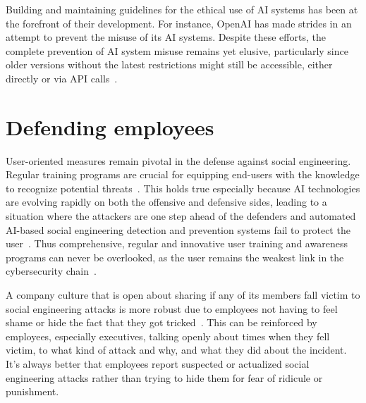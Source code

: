 
Building and maintaining guidelines for the ethical use of AI systems has been at the forefront of their development. For instance, OpenAI has made strides in an attempt to prevent the misuse of its AI systems. Despite these efforts, the complete prevention of AI system misuse remains yet elusive, particularly since older versions without the latest restrictions might still be accessible, either directly or via API calls~\citep{gupta_From_ChatGPT_to_ThreatGPT_2023}.

\section{Defending employees}
\begin{comment}
\end{comment}

User-oriented measures remain pivotal in the defense against social engineering. Regular training programs are crucial for equipping end-users with the knowledge to recognize potential threats~\citep{hadnagy_Social_Engineering_The_Science_2018}. This holds true especially because AI technologies are evolving rapidly on both the offensive and defensive sides, leading to a situation where the attackers are one step ahead of the defenders and automated AI-based social engineering detection and prevention systems fail to protect the user~\citep{fakhouri_AI_Driven_Solutions_SE_Attacks_2024}. Thus comprehensive, regular and innovative user training and awareness programs can never be overlooked, as the user remains the weakest link in the cybersecurity chain~\citep{mitnick_The_Art_of_Deception_2003}.

A company culture that is open about sharing if any of its members fall victim to social engineering attacks is more robust due to employees not having to feel shame or hide the fact that they got tricked~\citep{hadnagy_Social_Engineering_The_Science_2018}. This can be reinforced by employees, especially executives, talking openly about times when they fell victim, to what kind of attack and why, and what they did about the incident. It's always better that employees report suspected or actualized social engineering attacks rather than trying to hide them for fear of ridicule or punishment.

